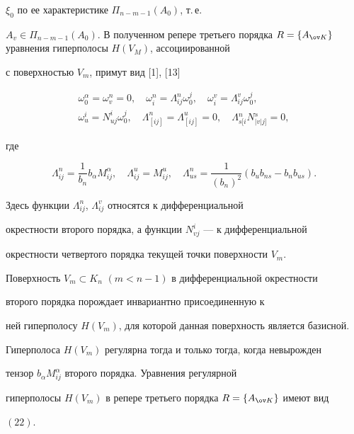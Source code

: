 $\xi_0$ по ее характеристике $\Pi_{n-m-1}(A_0)$, т.\,е. 


$A_v\in\Pi_{n-m-1}(A_0)$. В полученном репере третьего порядка $R=\{A_{\ov 


K}\}$ уравнения гиперполосы $H(V_M)$, ассоциированной 


с поверхностью $V_m$, примут вид [1], [13] 


\begin{equation} 


\begin{array}{c} 


\omega^\alpha_0=\omega^n_v=0,\quad \omega^n_i=\Lambda^n_{ij} 


\omega^j_0,\quad \omega^v_i=\Lambda^v_{ij}\omega^j_0,\\[2mm] 


\omega^i_u=N^i_{uj}\omega^j_0,\quad \Lambda^n_{[ij]}= 


\Lambda^u_{[ij]}=0,\quad \Lambda{}^n_{s[i} 


N{}^s_{|v|j]}=0, 


\end{array} 


\end{equation} 


где 


$$ 


\Lambda^n_{ij}=\frac{1}{b_n}b_\alpha M^\alpha_{ij},\quad 


\Lambda^u_{ij}=M^u_{ij},\quad \Lambda^n_{us}=\frac{1}{(b_n)^2} 


(b_u b_{ns}-b_n b_{us}). 


$$ 


Здесь функции $\Lambda^n_{ij}$, $\Lambda^v_{ij}$ относятся к дифференциальной 


окрестности второго порядка, а функции $N^i_{vj}$ --- к дифференциальной 


окрестности четвертого порядка текущей точки поверхности $V_m$. 


 


\begin{thm} 


Поверхность $V_m\subset K_n$ $(m<n-1)$ в дифференциальной окрестности 


второго порядка порождает инвариантно присоединенную к 


ней гиперполосу $H(V_m)$, для которой данная поверхность является базисной. 


Гиперполоса $H(V_m)$ регулярна тогда и только тогда, когда невырожден 


тензор $b_\alpha M^\alpha_{ij}$ второго порядка. Уравнения регулярной 


гиперполосы $H(V_m)$ в репере третьего порядка $R=\{A_{\ov K}\}$ имеют вид 


$(22)$. 


\end{thm} 


